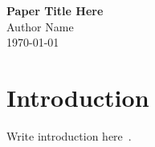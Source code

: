\documentclass[12pt,a4paper]{article}
\begin{document}
\begin{center}
{\LARGE \textbf{Paper Title Here}} \\[12pt]
{\large Author Name} \\[4pt]
\today
\end{center}

\begin{abstract}
\noindent
Write abstract here.
\end{abstract}

\section{Introduction}

Write introduction here~\cite{key}.

\printbibliography
\end{document}
